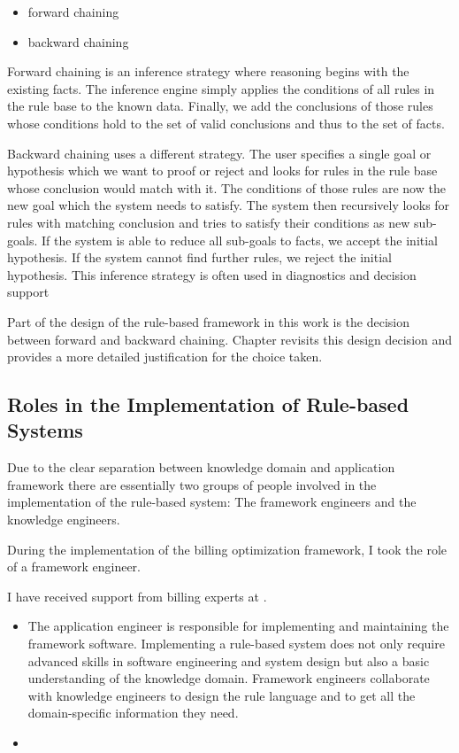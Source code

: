 \begin{itemize}
    \item forward chaining
    \item backward chaining
\end{itemize}

Forward chaining is an inference strategy where reasoning begins with the existing facts.
The inference engine simply applies the conditions of all rules in the rule base to the known data.
Finally,
we add the conclusions of those rules
whose conditions hold to the set of valid conclusions and thus to the set of facts.

Backward chaining uses a different strategy\cite{al2015comparison}.
The user specifies a single goal or hypothesis
which we want to proof or reject and looks for rules in the rule base whose conclusion would match with it.
The conditions of those rules are now the new goal which the system needs to satisfy.
The system then recursively looks for rules with matching conclusion
and tries to satisfy their conditions as new sub-goals.
If the system is able to reduce all sub-goals to facts, we accept the initial hypothesis.
If the system cannot find further rules, we reject the initial hypothesis.
This inference strategy is often used in diagnostics and decision support\cite{https://doi.org/10.1002/widm.11}

Part of the design of the rule-based framework in this work is the decision between forward and backward chaining.
Chapter  revisits this design decision
and provides a more detailed justification for the choice taken.

\subsection{Roles in the Implementation of Rule-based Systems}\label{subsec:roles-in-the-implementation-of-rule-based-systems} 
Due to the clear separation between knowledge domain and application framework there are essentially two groups of people
involved in the implementation of the rule-based system:
The framework engineers and the knowledge engineers.

During the implementation of the billing optimization framework, I took the role of a framework engineer.

I have received support from billing experts at \AV.

\begin{itemize}
    \item The application engineer is responsible for implementing and maintaining the framework software.
    Implementing a rule-based system does not only require advanced skills in software engineering and system design but also a basic understanding of the knowledge domain.
    Framework engineers collaborate with knowledge engineers to design the rule language
    and to get all the domain-specific information they need.
    \item
\end{itemize}
